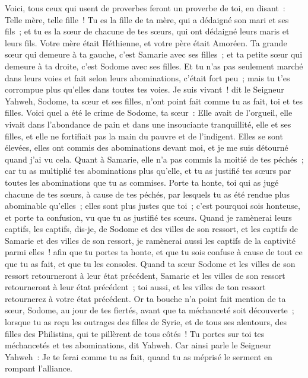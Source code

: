 \begin{multicols}{2}
Voici, tous ceux qui usent de proverbes feront un proverbe de toi, en disant~: Telle mère, telle fille~!
Tu es la fille de ta mère, qui a dédaigné son mari et ses fils~; et tu es la sœur de chacune de tes sœurs, qui ont dédaigné leurs maris et leurs fils. Votre mère était Héthienne, et votre père était Amoréen.
Ta grande sœur qui demeure à ta gauche, c'est Samarie avec ses filles~; et ta petite sœur qui demeure à ta droite, c'est Sodome avec ses filles.
Et tu n'as pas seulement marché dans leurs voies et fait selon leurs abominations, c'était fort peu~; mais tu t'es corrompue plus qu'elles dans toutes tes voies.
Je suis vivant~! dit le Seigneur Yahweh, Sodome, ta sœur et ses filles, n'ont point fait comme tu as fait, toi et tes filles.
Voici quel a été le crime de Sodome, ta sœur~: Elle avait de l'orgueil, elle vivait dans l'abondance de pain et dans une insouciante tranquillité, elle et ses filles, et elle ne fortifiait pas la main du pauvre et de l'indigent.
Elles se sont élevées, elles ont commis des abominations devant moi, et je me suis détourné quand j'ai vu cela.
Quant à Samarie, elle n'a pas commis la moitié de tes péchés~; car tu as multiplié tes abominations plus qu'elle, et tu as justifié tes sœurs par toutes les abominations que tu as commises.
Porte ta honte, toi qui as jugé chacune de tes sœurs, à cause de tes péchés, par lesquels tu as été rendue plus abominable qu'elles~; elles sont plus justes que toi~; c'est pourquoi sois honteuse, et porte ta confusion, vu que tu as justifié tes sœurs.
Quand je ramènerai leurs captifs, les captifs, dis-je, de Sodome et des villes de son ressort, et les captifs de Samarie et des villes de son ressort, je ramènerai aussi les captifs de la captivité parmi elles~!
afin que tu portes ta honte, et que tu sois confuse à cause de tout ce que tu as fait, et que tu les consoles.
Quand ta sœur Sodome et les villes de son ressort retourneront à leur état précédent, Samarie et les villes de son ressort retourneront à leur état précédent~; toi aussi, et les villes de ton ressort retournerez à votre état précédent.
Or ta bouche n'a point fait mention de ta sœur, Sodome, au jour de tes fiertés,
avant que ta méchanceté soit découverte~; lorsque tu as reçu les outrages des filles de Syrie, et de tous ses alentours, des filles des Philistins, qui te pillèrent de tous côtés~!
Tu portes sur toi tes méchancetés et tes abominations, dit Yahweh.
Car ainsi parle le Seigneur Yahweh~: Je te ferai comme tu as fait, quand tu as méprisé le serment en rompant l'alliance.

\end{multicols}
